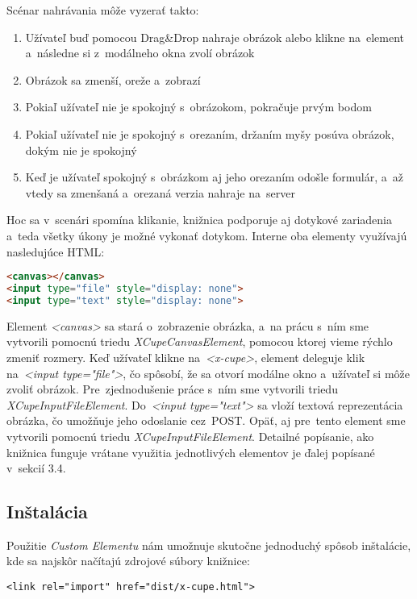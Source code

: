 Scénar nahrávania môže vyzerať takto:
\begin{enumerate}
	\item Užívateľ buď pomocou Drag&Drop nahraje obrázok alebo klikne na~element a~následne si z~modálneho okna zvolí obrázok
	\item Obrázok sa zmenší, oreže a~zobrazí
	\item Pokiaľ užívateľ nie je spokojný s~obrázokom, pokračuje prvým bodom
	\item Pokiaľ užívateľ nie je spokojný s~orezaním, držaním myšy posúva obrázok, dokým nie je spokojný
	\item Keď je užívateľ spokojný s~obrázkom aj jeho orezaním odošle formulár, a~až vtedy sa zmenšaná a~orezaná verzia nahraje na~server
\end{enumerate}

Hoc sa v~scenári spomína klikanie, knižnica podporuje aj dotykové zariadenia a~teda všetky úkony je možné vykonať dotykom. Interne oba elementy využívajú nasledujúce HTML:

\begin{lstlisting}[language=HTML]
<canvas></canvas>
<input type="file" style="display: none">
<input type="text" style="display: none">
\end{lstlisting}

Element \emph{<canvas>} sa stará o~zobrazenie obrázka, a~na prácu s~ním sme vytvorili pomocnú triedu \emph{XCupeCanvasElement}, pomocou ktorej vieme rýchlo zmeniť rozmery. Keď užívateľ klikne na~\emph{<x-cupe>}, element deleguje klik na~\emph{<input type="file"\textgreater}, čo spôsobí, že sa otvorí modálne okno a~užívateľ si môže zvoliť obrázok. Pre~zjednodušenie práce s~ním sme vytvorili triedu \emph{XCupeInputFileElement}. Do~\emph{<input type="text"\textgreater} sa vloží textová reprezentácia obrázka, čo umožňuje jeho odoslanie cez~POST. Opäť, aj pre~tento element sme vytvorili pomocnú triedu \emph{XCupeInputFileElement}. Detailné popísanie, ako knižnica funguje vrátane využitia jednotlivých elementov je ďalej popísané v~sekcií 3.4.

\subsection{Inštalácia}

Použitie \emph{Custom Elementu} nám umožnuje skutočne jednoduchý spôsob inštalácie, kde sa najskôr načítajú zdrojové súbory knižnice:
\begin{lstlisting}
<link rel="import" href="dist/x-cupe.html">
\end{lstlisting}

